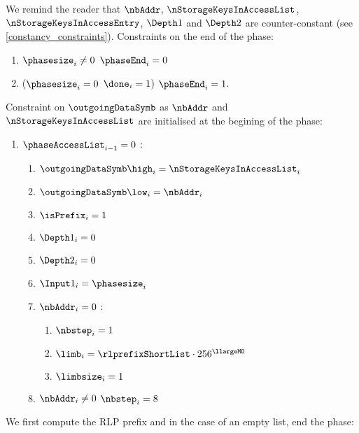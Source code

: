 \begin{center}
\end{center} 

We remind the reader that $\nbAddr$, $\nStorageKeysInAccessList$, $\nStorageKeysInAccessEntry$, $\Depth1$ and $\Depth2$ are counter-constant (see \ref{constancy_constraints}).
\newline
Constraints on the end of the phase:
\begin{enumerate}
	\item \If $\phasesize_{i} \neq 0$ \Then $\phaseEnd_{i}=0$
	\item\label{constraint: end of access set phase} \If ($\phasesize_{i}=0$ \et $\done_{i}=1$) \Then $\phaseEnd_{i}=1$.
\end{enumerate}
Constraint on $\outgoingDataSymb$ as $\nbAddr$ and $\nStorageKeysInAccessList$ are initialised at the begining of the phase:
\begin{enumerate}[resume]
	\item \If $\phaseAccessList_{i-1}=0$ \Then:
		\begin{enumerate}
			\item $\outgoingDataSymb\high_{i}=\nStorageKeysInAccessList_{i}$
			\item $\outgoingDataSymb\low_{i}=\nbAddr_{i}$
			\item $\isPrefix_{i}=1$
			\item $\Depth1_{i} = 0$
			\item $\Depth2_{i} = 0$
			\item $\Input1_{i} = \phasesize_{i}$
			\item \If $\nbAddr_{i}=0$ \Then: 
				\begin{enumerate}
					\item $\nbstep_{i}=1$
					\item $\limb_{i}=\rlprefixShortList \cdot 256 ^{\llargeMO}$
					\item $\limbsize_{i}=1$
				\end{enumerate}
			\item \If $\nbAddr_{i} \neq 0$ \Then $\nbstep_{i}=8$
		\end{enumerate} 
\end{enumerate}
We first compute the RLP prefix and in the case of an empty list, end the phase:
